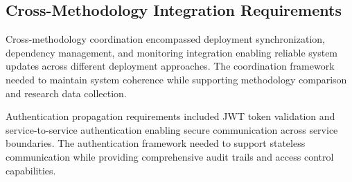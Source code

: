 \subsection{Cross-Methodology Integration Requirements}

Cross-methodology coordination encompassed deployment synchronization, dependency management, and monitoring integration enabling reliable system updates across different deployment approaches. The coordination framework needed to maintain system coherence while supporting methodology comparison and research data collection.

Authentication propagation requirements included JWT token validation and service-to-service authentication enabling secure communication across service boundaries. The authentication framework needed to support stateless communication while providing comprehensive audit trails and access control capabilities.

